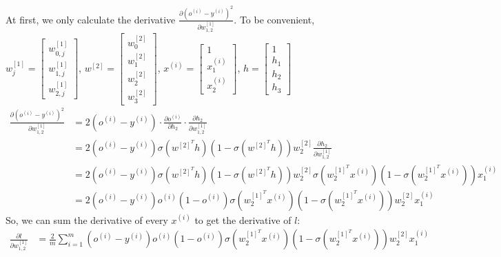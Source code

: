 \begin{answer}
At first, we only calculate the derivative $\frac{\partial (o^{(i)} - y^{(i)})^2}{\partial w^{[1]}_{1,2}}$. To be convenient, $w^{[1]}_j = \begin{bmatrix} w^{[1]}_{0, j} \\ w^{[1]}_{1, j} \\ w^{[1]}_{2, j}\end{bmatrix}$, $w^{[2]} = \begin{bmatrix} w^{[2]}_{0} \\ w^{[2]}_{1} \\ w^{[2]}_{2}\\ w^{[2]}_{3}\end{bmatrix}$, $x^{(i)} = \begin{bmatrix}1\\ x^{(i)}_1\\ x^{(i)}_2 \end{bmatrix}$, $h = \begin{bmatrix}1\\ h_1\\ h_2\\ h_3 \end{bmatrix}$
\begin{align*}
    \frac{\partial (o^{(i)} - y^{(i)})^2}{\partial w^{[1]}_{1,2}} &= 2(o^{(i)} - y^{(i)}) \cdot \frac{\partial o^{(i)}}{\partial h_2} \cdot \frac{\partial h_2}{\partial w^{[1]}_{1,2}}\\
    &= 2(o^{(i)} - y^{(i)}) \sigma(w^{[2]^T} h) (1 - \sigma(w^{[2]^T} h)) w^{[2]}_2 \frac{\partial h_2}{\partial w^{[1]}_{1, 2}}\\
    &= 2(o^{(i)} - y^{(i)}) \sigma(w^{[2]^T} h) (1 - \sigma(w^{[2]^T} h)) w^{[2]}_2 \sigma(w^{[1]^T}_2 x^{(i)}) (1 - \sigma(w^{[1]^T}_2 x^{(i)})) x^{(i)}_1\\
    &= 2(o^{(i)} - y^{(i)}) o^{(i)} (1 - o^{(i)})\sigma(w^{[1]^T}_2 x^{(i)}) (1 - \sigma(w^{[1]^T}_2 x^{(i)})) w^{[2]}_2 x^{(i)}_1
\end{align*}
So, we can sum the derivative of every $x^{(i)}$ to get the derivative of $l$:
\begin{align*}
    \frac{\partial l}{\partial w^{[1]}_{1,2}} &= \frac{2}{m} \sum\limits_{i=1}^m (o^{(i)} - y^{(i)}) o^{(i)} (1 - o^{(i)})\sigma(w^{[1]^T}_2 x^{(i)}) (1 - \sigma(w^{[1]^T}_2 x^{(i)})) w^{[2]}_2 x^{(i)}_1
\end{align*}
\end{answer}
